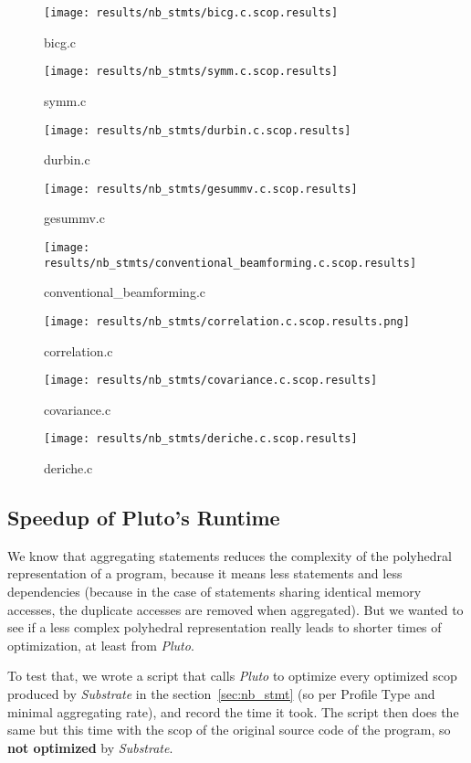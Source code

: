 \documentclass[paper=a4, fontsize=11.5pt]{scrartcl}
\numberwithin{equation}{section}        %
\numberwithin{figure}{section}          %
\numberwithin{table}{section}               %
\begin{document}
\begin{figure}[H]
    \center
    \texttt{[image: results/nb\_stmts/bicg.c.scop.results]}
    \caption{bicg.c}\label{fig:nb_stmts:bicg}
    \texttt{[image: results/nb\_stmts/symm.c.scop.results]}
    \caption{symm.c}\label{fig:nb_stmts:symm}
\end{figure}
\begin{figure}[H]
    \center
    \texttt{[image: results/nb\_stmts/durbin.c.scop.results]}
    \caption{durbin.c}\label{fig:nb_stmts:durbin}
    \texttt{[image: results/nb\_stmts/gesummv.c.scop.results]}
    \caption{gesummv.c}\label{fig:nb_stmts:gesummv}
\end{figure}
\begin{figure}[H]
    \center
    \texttt{[image: results/nb\_stmts/conventional\_beamforming.c.scop.results]}
    \caption{conventional\_beamforming.c}\label{fig:nb_stmts:conv_beam}
    \texttt{[image: results/nb\_stmts/correlation.c.scop.results.png]}
    \caption{correlation.c}\label{fig:nb_stmts:correlation}
\end{figure}
\begin{figure}[H]
    \center
    \texttt{[image: results/nb\_stmts/covariance.c.scop.results]}
    \caption{covariance.c}\label{fig:nb_stmts:covariance}
    \texttt{[image: results/nb\_stmts/deriche.c.scop.results]}
    \caption{deriche.c}\label{fig:nb_stmts:deriche}
\end{figure}
\restoregeometry

\subsection{Speedup of Pluto's Runtime}
\label{sec:speedup_pluto}

We know that aggregating statements reduces the complexity of the polyhedral representation
of a program, because it means less statements and less dependencies (because in the case
of statements sharing identical memory accesses, the duplicate accesses are removed when aggregated).
But we wanted to see if a less complex polyhedral representation really leads to shorter
times of optimization, at least from \textit{Pluto}.

\bigskip

To test that, we wrote a script that calls \textit{Pluto} to optimize every optimized scop produced
by \textit{Substrate} in the section~\ref{sec:nb_stmt} (so per Profile Type and minimal aggregating rate),
and record the time it took. The script then does the same but this time with the scop of
the original source code of the program, so \textbf{not optimized} by \textit{Substrate}.\\
\end{document}
